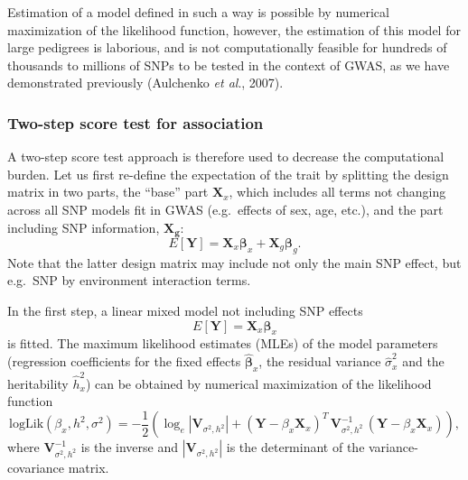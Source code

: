\documentclass[12pt,a4paper]{article}
\begin{document}
Estimation of a model defined in such a way is possible by numerical
maximization of the likelihood function, however, the estimation of
this model for large pedigrees is laborious, and is not
computationally feasible for hundreds of thousands to millions of SNPs
to be tested in the context of GWAS, as we have demonstrated
previously (Aulchenko \emph{et al}., 2007).

\subsubsection{Two-step score test for association}
A two-step score test approach is therefore used to decrease the
computational burden. Let us first re-define the expectation of the
trait by splitting the design matrix in two parts, the ``base'' part
$\mathbf{X}_x$, which includes all terms not changing across all SNP
models fit in GWAS (e.g.\ effects of sex, age, etc.), and the part
including SNP information, $\mathbf{X_g}$:
$$
E[\mathbf{Y}] = \mathbf{X}_x \mathbf{\beta}_x +
\mathbf{X}_g \mathbf{\beta}_g.
$$
Note that the latter design matrix may include not only the main SNP
effect, but e.g.\ SNP by environment interaction terms.

In the first step, a linear mixed model not including SNP effects
$$
E[\mathbf{Y}] = \mathbf{X}_x \mathbf{\beta}_x
$$
is fitted. The maximum likelihood estimates (MLEs) of the model
parameters (regression coefficients for the fixed effects
$\hat{\mathbf{\beta}}_x$, the residual variance $\hat{\sigma}^2_x$ and
the heritability $\hat{h}^2_x$) can be obtained by numerical
maximization of the likelihood function
$$
\mathrm{logLik}(\beta_x,h^2,\sigma^2) = -\frac{1}{2} \left(
  \log_e|\mathbf{V}_{\sigma^2,h^2}| + (\mathbf{Y} - \beta_x
  \mathbf{X}_x)^T \, \mathbf{V}_{\sigma^2,h^2}^{-1} \, (\mathbf{Y} -
  \beta_x \mathbf{X}_x) \right ),
$$
where $\mathbf{V}_{\sigma^2,h^2}^{-1}$ is the inverse and
$|\mathbf{V}_{\sigma^2,h^2}|$ is the determinant of the
variance-covariance matrix.
\end{document}
